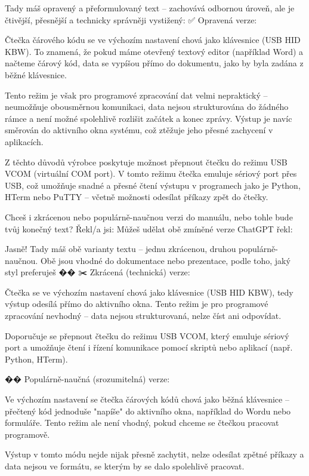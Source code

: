 Tady máš opravený a přeformulovaný text – zachovává odbornou úroveň, ale je čtivější, přesnější a technicky správněji vystižený:
✅ Opravená verze:

    Čtečka čárového kódu se ve výchozím nastavení chová jako klávesnice (USB HID KBW). To znamená, že pokud máme otevřený textový editor (například Word) a načteme čárový kód, data se vypíšou přímo do dokumentu, jako by byla zadána z běžné klávesnice.

    Tento režim je však pro programové zpracování dat velmi nepraktický – neumožňuje obousměrnou komunikaci, data nejsou strukturována do žádného rámce a není možné spolehlivě rozlišit začátek a konec zprávy. Výstup je navíc směrován do aktivního okna systému, což ztěžuje jeho přesné zachycení v aplikacích.

    Z těchto důvodů výrobce poskytuje možnost přepnout čtečku do režimu USB VCOM (virtuální COM port). V tomto režimu čtečka emuluje sériový port přes USB, což umožňuje snadné a přesné čtení výstupu v programech jako je Python, HTerm nebo PuTTY – včetně možnosti odesílat příkazy zpět do čtečky.

Chceš i zkrácenou nebo populárně-naučnou verzi do manuálu, nebo tohle bude tvůj konečný text?
Řekl/a jsi:
Můžeš udělat obě zmíněné verze
ChatGPT řekl:

Jasně! Tady máš obě varianty textu – jednu zkrácenou, druhou populárně-naučnou. Obě jsou vhodné do dokumentace nebo prezentace, podle toho, jaký styl preferuješ ��
✂️ Zkrácená (technická) verze:

    Čtečka se ve výchozím nastavení chová jako klávesnice (USB HID KBW), tedy výstup odesílá přímo do aktivního okna. Tento režim je pro programové zpracování nevhodný – data nejsou strukturovaná, nelze číst ani odpovídat.

    Doporučuje se přepnout čtečku do režimu USB VCOM, který emuluje sériový port a umožňuje čtení i řízení komunikace pomocí skriptů nebo aplikací (např. Python, HTerm).

�� Populárně-naučná (srozumitelná) verze:

    Ve výchozím nastavení se čtečka čárových kódů chová jako běžná klávesnice – přečtený kód jednoduše "napíše" do aktivního okna, například do Wordu nebo formuláře. Tento režim ale není vhodný, pokud chceme se čtečkou pracovat programově.

    Výstup v tomto módu nejde nijak přesně zachytit, nelze odesílat zpětné příkazy a data nejsou ve formátu, se kterým by se dalo spolehlivě pracovat.

